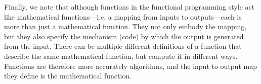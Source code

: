 \begin{cluster}
\label{grp:grm:language:introduction::function-vs-algorithm}

\begin{gram}
\label{grm:language:introduction::function-vs-algorithm}
  Finally, we note that although functions in the functional
  programming style act like mathematical functions---i.e. a mapping
  from inputs to outputs---each is more than just a mathematical
  function.  They not only embody the mapping, but they also specify
  the mechanism (code) by which the output is generated from the
  input.  There can be multiple different definitions of a function
  that describe the same mathematical function, but compute it in
  different ways.  Functions are therefore more accurately algorithms,
  and the input to output map they define is the mathematical
  function.

\end{gram}
\end{cluster}


